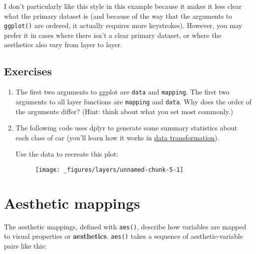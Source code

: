 I don't particularly like this style in this example because it makes it
less clear what the primary dataset is (and because of the way that the
arguments to \texttt{ggplot()} are ordered, it actually requires more
keystrokes). However, you may prefer it in cases where there isn't a
clear primary dataset, or where the aesthetics also vary from layer to
layer.

\subsection{Exercises}\label{exercises}

\begin{enumerate}
\def\labelenumi{\arabic{enumi}.}
\item
  The first two arguments to ggplot are \texttt{data} and
  \texttt{mapping}. The first two arguments to all layer functions are
  \texttt{mapping} and \texttt{data}. Why does the order of the
  arguments differ? (Hint: think about what you set most commonly.)
\item
  The following code uses dplyr to generate some summary statistics
  about each class of car (you'll learn how it works in
  \protect\hyperlink{cha:dplyr}{data transformation}).

\begin{Shaded}
\end{Shaded}

  Use the data to recreate this plot:

  \begin{figure}[H]
    \centering
    \texttt{[image: \_figures/layers/unnamed-chunk-5-1]}
  \end{figure}
\end{enumerate}

\hypertarget{sec:aes}{\section{Aesthetic mappings}\label{sec:aes}}

The aesthetic mappings, defined with \texttt{aes()}, describe how
variables are mapped to visual properties or \textbf{aesthetics}.
\texttt{aes()} takes a sequence of aesthetic-variable pairs like this:
 

